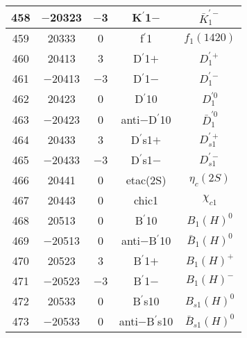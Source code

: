 \documentclass{article}
\begin{document}
\begin{table}[!htbp]
\begin{tabular}{|c|c|c|c|c|}
\hline
458 & $-$20323 & $-$3 & K$^{\prime}$\underline{\hspace{0.6em}}1$-$ & $\bar{K}_1^{'-}$ \\
\hline
459 & 20333 & 0 & f$^{\prime}$\underline{\hspace{0.6em}}1 & $f_{1}(1420)$ \\
\hline
460 & 20413 & 3 & D$^{\prime}$\underline{\hspace{0.6em}}1$+$ & $D_{1}^{\prime+}$ \\
\hline
461 & $-$20413 & $-$3 & D$^{\prime}$\underline{\hspace{0.6em}}1$-$ & $D_{1}^{\prime-}$ \\
\hline
462 & 20423 & 0 & D$^{\prime}$\underline{\hspace{0.6em}}10 & $D_{1}^{\prime0}$ \\
\hline
463 & $-$20423 & 0 & anti$-$D$^{\prime}$\underline{\hspace{0.6em}}10 & $\bar{D}_{1}^{\prime0}$ \\
\hline
464 & 20433 & 3 & D$^{\prime}$\underline{\hspace{0.6em}}s1$+$ & $D_{s1}^{\prime+}$ \\
\hline
465 & $-$20433 & $-$3 & D$^{\prime}$\underline{\hspace{0.6em}}s1$-$ & $D_{s1}^{\prime-}$ \\
\hline
466 & 20441 & 0 & eta\underline{\hspace{0.6em}}c(2S) & $\eta_{c}(2S)$ \\
\hline
467 & 20443 & 0 & chi\underline{\hspace{0.6em}}c1 & $\chi_{c1}$ \\
\hline
468 & 20513 & 0 & B$^{\prime}$\underline{\hspace{0.6em}}10 & $B_{1}(H)^{0}$ \\
\hline
469 & $-$20513 & 0 & anti$-$B$^{\prime}$\underline{\hspace{0.6em}}10 & $\bar{B}_{1}(H)^{0}$ \\
\hline
470 & 20523 & 3 & B$^{\prime}$\underline{\hspace{0.6em}}1$+$ & $B_{1}(H)^{+}$ \\
\hline
471 & $-$20523 & $-$3 & B$^{\prime}$\underline{\hspace{0.6em}}1$-$ & $B_{1}(H)^{-}$ \\
\hline
472 & 20533 & 0 & B$^{\prime}$\underline{\hspace{0.6em}}s10 & $B_{s1}(H)^{0}$ \\
\hline
473 & $-$20533 & 0 & anti$-$B$^{\prime}$\underline{\hspace{0.6em}}s10 & $\bar{B}_{s1}(H)^{0}$ \\

\end{tabular}
\end{table}
\end{document}
